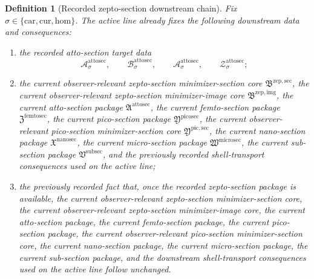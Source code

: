 \documentclass[11pt]{article}
\newcommand{\Car}{\mathrm{car}}
\newcommand{\Cur}{\mathrm{cur}}
\newcommand{\Hom}{\mathrm{hom}}
\newcommand{\SubSectionPackage}{\mathfrak V^{\mathrm{subsec}}}
\newcommand{\MicroSectionPackage}{\mathfrak W^{\mathrm{microsec}}}
\newcommand{\NanoSectionPackage}{\mathfrak X^{\mathrm{nanosec}}}
\newcommand{\PicoSectionPackage}{\mathfrak Y^{\mathrm{picosec}}}
\newcommand{\PicoMinSectionCore}{\mathfrak Y^{\mathrm{pic,sec}}}
\newcommand{\FemtoSectionPackage}{\mathfrak Z^{\mathrm{femtosec}}}
\newcommand{\AttoSectionPackage}{\mathfrak A^{\mathrm{attosec}}}
\newcommand{\AttoSectionSpace}[1]{\mathcal A_{#1}^{\mathrm{attosec}}}
\newcommand{\AttoSectionBody}[1]{\mathcal B_{#1}^{\mathrm{attosec}}}
\newcommand{\AttoSectionFunctional}[1]{\mathscr A_{#1}^{\mathrm{attosec}}}
\newcommand{\AttoSectionShell}[1]{\mathcal Z_{#1}^{\mathrm{attosec}}}
\newcommand{\ZeptoImageCore}{\mathfrak B^{\mathrm{zep,img}}}
\newcommand{\ZeptoMinSectionCore}{\mathfrak B^{\mathrm{zep,sec}}}
\newtheorem{definition}{Definition}
\begin{document}
\begin{definition}[Recorded zepto-section downstream chain]
\label{def:downstream}
Fix \(\sigma\in\{\Car,\Cur,\Hom\}\). The active line already fixes the following downstream data and consequences:
\begin{enumerate}
    \item the recorded atto-section target data
    \[
    \AttoSectionSpace{\sigma},\qquad
    \AttoSectionBody{\sigma},\qquad
    \AttoSectionFunctional{\sigma},\qquad
    \AttoSectionShell{\sigma};
    \]
    \item the current observer-relevant zepto-section minimizer-section core \(\ZeptoMinSectionCore\), the current observer-relevant zepto-section minimizer-image core \(\ZeptoImageCore\), the current atto-section package \(\AttoSectionPackage\), the current femto-section package \(\FemtoSectionPackage\), the current pico-section package \(\PicoSectionPackage\), the current observer-relevant pico-section minimizer-section core \(\PicoMinSectionCore\), the current nano-section package \(\NanoSectionPackage\), the current micro-section package \(\MicroSectionPackage\), the current sub-section package \(\SubSectionPackage\), and the previously recorded shell-transport consequences used on the active line;
    \item the previously recorded fact that, once the recorded zepto-section package is available, the current observer-relevant zepto-section minimizer-section core, the current observer-relevant zepto-section minimizer-image core, the current atto-section package, the current femto-section package, the current pico-section package, the current observer-relevant pico-section minimizer-section core, the current nano-section package, the current micro-section package, the current sub-section package, and the downstream shell-transport consequences used on the active line follow unchanged.
\end{enumerate}
\end{definition}
\end{document}
